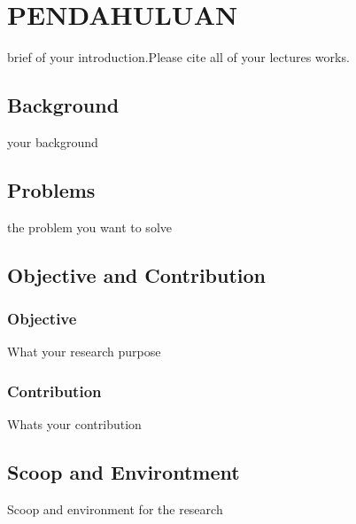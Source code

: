 \chapter{PENDAHULUAN}

brief of your introduction.Please cite all of your lectures works\cite{pane2018qualitative}\cite{awangga2018k}\cite{Awangga2017}\cite{yulita2017quantization}.

\section{Background}
your background

\section{Problems}
the problem you want to solve

\section{Objective and Contribution}
\subsection{Objective}
What your research purpose

\subsection{Contribution}
Whats your contribution

\section{Scoop and Environtment}
Scoop and environment for the research
